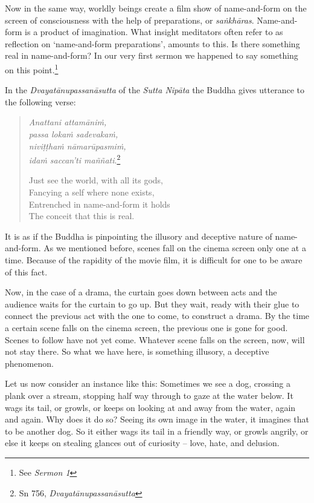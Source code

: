 Now in the same way, worldly beings create a film show of name-and-form on the screen of consciousness with the help of preparations, or \emph{saṅkhāras}. Name-and-form is a product of imagination. What insight meditators often refer to as reflection on `name-and-form preparations', amounts to this. Is there something real in name-and-form? In our very first sermon we happened to say something on this point.\footnote{See \emph{Sermon 1}}

In the \emph{Dvayatānupassanāsutta} of the \emph{Sutta Nipāta} the Buddha gives utterance to the following verse:

\begin{quote}
\emph{Anattani attamāniṁ,}\\
\emph{passa lokaṁ sadevakaṁ,}\\
\emph{niviṭṭhaṁ nāmarūpasmiṁ,}\\
\emph{idaṁ saccan'ti maññati}.\footnote{Sn 756, \emph{Dvayatānupassanāsutta}}

Just see the world, with all its gods,\\
Fancying a self where none exists,\\
Entrenched in name-and-form it holds\\
The conceit that this is real.
\end{quote}

It is as if the Buddha is pinpointing the illusory and deceptive nature of name-and-form. As we mentioned before, scenes fall on the cinema screen only one at a time. Because of the rapidity of the movie film, it is difficult for one to be aware of this fact.

Now, in the case of a drama, the curtain goes down between acts and the audience waits for the curtain to go up. But they wait, ready with their glue to connect the previous act with the one to come, to construct a drama. By the time a certain scene falls on the cinema screen, the previous one is gone for good. Scenes to follow have not yet come. Whatever scene falls on the screen, now, will not stay there. So what we have here, is something illusory, a deceptive phenomenon.

Let us now consider an instance like this: Sometimes we see a dog, crossing a plank over a stream, stopping half way through to gaze at the water below. It wags its tail, or growls, or keeps on looking at and away from the water, again and again. Why does it do so? Seeing its own image in the water, it imagines that to be another dog. So it either wags its tail in a friendly way, or growls angrily, or else it keeps on stealing glances out of curiosity -- love, hate, and delusion.

